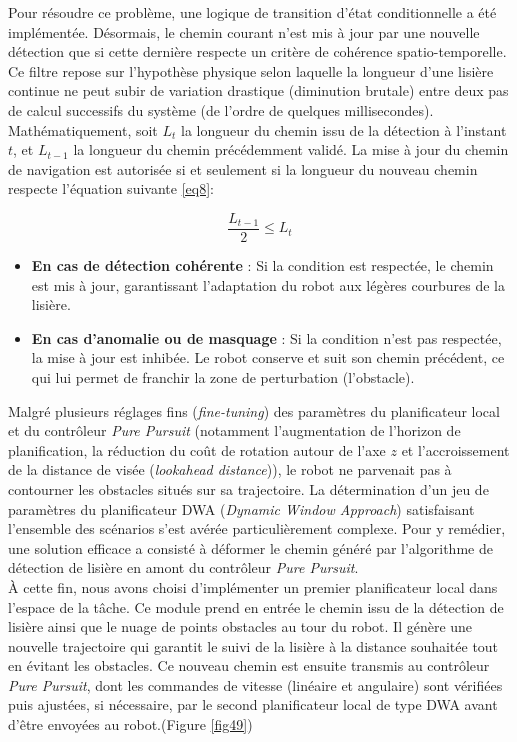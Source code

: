 \indent Pour résoudre ce problème, une logique de transition d'état conditionnelle a été implémentée. Désormais, le chemin courant n'est mis à jour par une nouvelle détection que si cette dernière respecte un critère de cohérence spatio-temporelle. Ce filtre repose sur l'hypothèse physique selon laquelle la longueur d'une lisière continue ne peut subir de variation drastique (diminution brutale) entre deux pas de calcul successifs du système (de l'ordre de quelques millisecondes). Mathématiquement, soit $L_{t}$ la longueur du chemin issu de la détection à l'instant $t$, et $L_{t-1}$ la longueur du chemin précédemment validé. La mise à jour du chemin de navigation est autorisée si et seulement si la longueur du nouveau chemin respecte l'équation suivante \eqref{eq8}:

\begin{equation}
\frac{L_{t-1}}{2} \leq L_{t}
\label{eq8}
\end{equation}

\begin{itemize}
\renewcommand{\labelitemi}{$\bullet$}
    \item \textbf{En cas de détection cohérente} : Si la condition est respectée, le chemin est mis à jour, garantissant l'adaptation du robot aux légères courbures de la lisière.
    \item \textbf{En cas d'anomalie ou de masquage} : Si la condition n'est pas respectée, la mise à jour est inhibée. Le robot conserve et suit son chemin précédent, ce qui lui permet de franchir la zone de perturbation (l'obstacle).\\
\end{itemize}

\indent Malgré plusieurs réglages fins (\textit{fine-tuning}) des paramètres du planificateur local et du contrôleur \textit{Pure Pursuit} (notamment l'augmentation de l'horizon de planification, la réduction du coût de rotation autour de l'axe $z$ et l'accroissement de la distance de visée (\textit{lookahead distance})), le robot ne parvenait pas à contourner les obstacles situés sur sa trajectoire. La détermination d'un jeu de paramètres du planificateur DWA (\textit{Dynamic Window Approach}) satisfaisant l'ensemble des scénarios s'est avérée particulièrement complexe. Pour y remédier, une solution efficace a consisté à déformer le chemin généré par l'algorithme de détection de lisière en amont du contrôleur \textit{Pure Pursuit}.\\

À cette fin, nous avons choisi d'implémenter un premier planificateur local dans l'espace de la tâche. Ce module prend en entrée le chemin issu de la détection de lisière ainsi que le nuage de points obstacles au tour du robot. Il génère une nouvelle trajectoire qui garantit le suivi de la lisière à la distance souhaitée tout en évitant les obstacles. Ce nouveau chemin est ensuite transmis au contrôleur \textit{Pure Pursuit}, dont les commandes de vitesse (linéaire et angulaire) sont vérifiées puis ajustées, si nécessaire, par le second planificateur local de type DWA avant d'être envoyées au robot.(Figure \ref{fig49})\\


